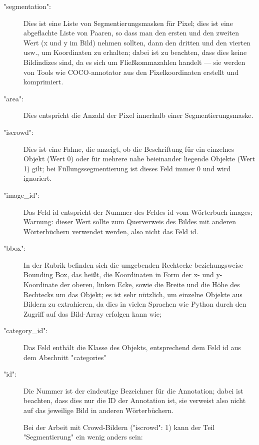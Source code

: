 \begin{description}
  \item["{}segmentation":] Dies ist eine Liste von Segmentierungsmasken für Pixel; dies ist eine abgeflachte Liste von Paaren, so dass man den ersten und den zweiten Wert (x und y im Bild) nehmen sollten, dann den dritten und den vierten usw., um Koordinaten zu erhalten; dabei ist zu beachten, dass dies keine Bildindizes sind, da es sich um Fließkommazahlen handelt --- sie werden von Tools wie COCO-annotator aus den Pixelkoordinaten erstellt und komprimiert.

  \item ["{}area":] Dies entspricht die  Anzahl der Pixel innerhalb einer Segmentierungsmaske.

  \item ["{}iscrowd":] Dies ist eine Fahne, die anzeigt, ob die Beschriftung für ein einzelnes Objekt (Wert 0) oder für mehrere nahe beieinander liegende Objekte (Wert 1) gilt; bei Füllungssegmentierung ist dieses Feld immer 0 und wird ignoriert.

  \item ["{}image\_id":] Das Feld id entspricht der Nummer des Feldes id vom Wörterbuch images; Warnung: dieser Wert sollte zum Querverweis des Bildes mit anderen Wörterbüchern verwendet werden, also nicht das Feld id.

  \item ["bbox":] In der Rubrik befinden sich die umgebenden Rechtecke beziehungsweise Bounding Box, das heißt, die Koordinaten in Form der x- und y-Koordinate der oberen, linken Ecke, sowie die Breite und die Höhe des Rechtecks um das Objekt; es ist sehr nützlich, um einzelne Objekte aus Bildern zu extrahieren, da dies in vielen Sprachen wie Python durch den Zugriff auf das Bild-Array erfolgen kann wie; 
  
  
  \item ["category\_id":] Das Feld enthält die Klasse des Objekts, entsprechend dem Feld id aus dem Abschnitt "categories"

  \item ["{}id":] Die Nummer ist der eindeutige Bezeichner für die Annotation; dabei ist beachten, dass dies nur die ID der Annotation ist, sie verweist also nicht auf das jeweilige Bild in anderen Wörterbüchern.

  \medskip
   
  Bei der Arbeit mit Crowd-Bildern ("iscrowd": 1) kann der Teil "Segmentierung" ein wenig anders sein:


\end{description}
